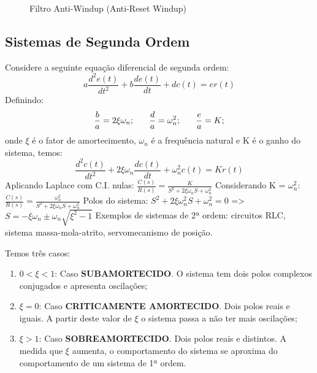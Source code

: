 \begin{enumerate}
\begin{enumerate}
\begin{figure}[h]
                            \caption{Filtro Anti-Windup (Anti-Reset Windup)}
                            \label{fig:filtro_anti_windup}
                        \end{figure}
        \end{enumerate}
\end{enumerate}
\newpage

\subsection{Sistemas de Segunda Ordem}

\hspace{4ex}Considere a seguinte equação diferencial de segunda ordem:
    \[a\frac{d^2e(t)}{dt^2}+b\frac{de(t)}{dt}+dc(t)=er(t)\]
Definindo:
    \[\frac{b}{a}=2\xi\omega_n; \hspace{4ex} \frac{d}{a}=\omega^2_n; \hspace{4ex} \frac{e}{a}=K;\]
onde \(\xi\) é o fator de amortecimento, \(\omega_n\) é a frequência natural e K é o ganho do sistema, temos:
    \[\frac{d^2c(t)}{dt^2}+2\xi\omega_n\frac{dc(t)}{dt}+\omega_n^2c(t)=Kr(t)\]
Aplicando Laplace com C.I. nulas: 
    \(\frac{C(s)}{R(s)}=\frac{K}{S^2+2\xi\omega_nS+\omega_n^2}\) 
    \newline
    \newline
Considerando K = \(\omega_n^2\): \(\frac{C(s)}{R(s)}=\frac{\omega_n^2}{S^2+2\xi\omega_nS+\omega_n^2}\)
    \newline
    \newline
Polos do sistema: \(S^2+2\xi\omega_n^2S+\omega_n^2=0\) => \(S=-\xi\omega_n\pm\omega_n\sqrt{\xi^2 -1}\)
    \newline
    \newline
Exemplos de sistemas de 2ª ordem: circuitos RLC, sistema massa-mola-atrito, servomecanismo de posição.
    \newline

Temos três casos:
\begin{enumerate}
    \item \(0 < \xi < 1\): Caso \textbf{SUBAMORTECIDO}. O sistema tem dois polos complexos conjugados e apresenta oscilações;
    \item \(\xi = 0\): Caso \textbf{CRITICAMENTE AMORTECIDO}. Dois polos reais e iguais. A partir deste valor de \(\xi\) o sistema passa a não ter mais oscilações;
    \item \(\xi > 1\): Caso \textbf{SOBREAMORTECIDO}. Dois polos reais e distintos. A medida que \(\xi\) aumenta, o comportamento do sistema se aproxima do comportamento de um sistema de 1ª ordem.
\end{enumerate}

